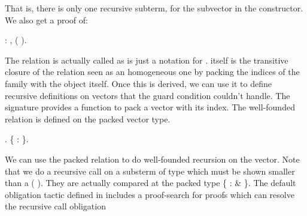   That is, there is only one recursive subterm, for the subvector
  in the  constructor. We also get a proof of:
 \begin{coqdoccode}
\coqdocemptyline
\coqdocnoindent
{}  : \coqdockw{\ensuremath{\forall}} ,  ( ).\coqdoceol
\coqdocemptyline
\end{coqdoccode}
The relation is actually called  as  is just
    a notation for .
     itself is the transitive closure of the relation seen as
    an homogeneous one by packing the indices of the family with the
    object itself. Once this is derived, we can use it to define
    recursive definitions on vectors that the guard condition couldn't
    handle. The signature provides a  function to pack a
    vector with its index. The well-founded relation is defined on the
    packed vector type. \begin{coqdoccode}
\coqdocemptyline
\coqdocnoindent
{} .\coqdoceol
\coqdocindent{1.00em}
 \{  : \}.\coqdoceol
\coqdocemptyline
\end{coqdoccode}
We can use the packed relation to do well-founded recursion on the vector.
      Note that we do a recursive call on a substerm of type    which
      must be shown smaller than a   ( ). They are actually compared
      at the packed type \{  :  \&   \}. The default obligation
      tactic defined in  includes a proof-search
      for  proofs which can resolve the recursive call obligation
